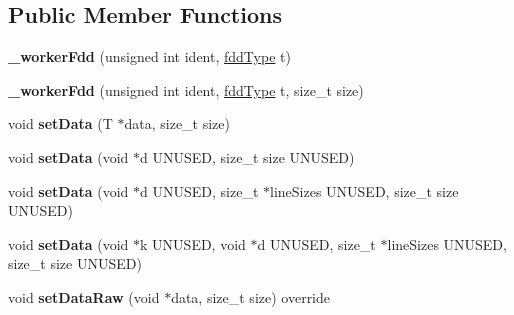 \subsection*{Public Member Functions}
\begin{DoxyCompactItemize}
\item 
\hypertarget{classfaster_1_1__workerFdd_a9f105bf8697f4f5332ccfb0fa7df8237}{}\label{classfaster_1_1__workerFdd_a9f105bf8697f4f5332ccfb0fa7df8237} 
{\bfseries \+\_\+worker\+Fdd} (unsigned int ident, \hyperlink{namespacefaster_aa8898687bc64536b60a3d5f365060cd6}{fdd\+Type} t)
\item 
\hypertarget{classfaster_1_1__workerFdd_ac8d6d1240857a56c57f5d85b6a4b67f5}{}\label{classfaster_1_1__workerFdd_ac8d6d1240857a56c57f5d85b6a4b67f5} 
{\bfseries \+\_\+worker\+Fdd} (unsigned int ident, \hyperlink{namespacefaster_aa8898687bc64536b60a3d5f365060cd6}{fdd\+Type} t, size\+\_\+t size)
\item 
\hypertarget{classfaster_1_1__workerFdd_a7031d0b585393f6e5a6ecc5e675a98ff}{}\label{classfaster_1_1__workerFdd_a7031d0b585393f6e5a6ecc5e675a98ff} 
void {\bfseries set\+Data} (T $\ast$data, size\+\_\+t size)
\item 
\hypertarget{classfaster_1_1__workerFdd_a18e7f4165cbd37d37f5759040b107cce}{}\label{classfaster_1_1__workerFdd_a18e7f4165cbd37d37f5759040b107cce} 
void {\bfseries set\+Data} (void $\ast$d U\+N\+U\+S\+ED, size\+\_\+t size U\+N\+U\+S\+ED)
\item 
\hypertarget{classfaster_1_1__workerFdd_ae2a8d9f60a3a0591f23dd5918451cecf}{}\label{classfaster_1_1__workerFdd_ae2a8d9f60a3a0591f23dd5918451cecf} 
void {\bfseries set\+Data} (void $\ast$d U\+N\+U\+S\+ED, size\+\_\+t $\ast$line\+Sizes U\+N\+U\+S\+ED, size\+\_\+t size U\+N\+U\+S\+ED)
\item 
\hypertarget{classfaster_1_1__workerFdd_a26f3dbf1187402ecd029a3ff1bf5f849}{}\label{classfaster_1_1__workerFdd_a26f3dbf1187402ecd029a3ff1bf5f849} 
void {\bfseries set\+Data} (void $\ast$k U\+N\+U\+S\+ED, void $\ast$d U\+N\+U\+S\+ED, size\+\_\+t $\ast$line\+Sizes U\+N\+U\+S\+ED, size\+\_\+t size U\+N\+U\+S\+ED)
\item 
\hypertarget{classfaster_1_1__workerFdd_a2439827c0e48411f92437a088f55b30f}{}\label{classfaster_1_1__workerFdd_a2439827c0e48411f92437a088f55b30f} 
void {\bfseries set\+Data\+Raw} (void $\ast$data, size\+\_\+t size) override
\item 
\hypertarget{classfaster_1_1__workerFdd_a236aaba89ce634bce445cfc8e00b0af1}{}\label{classfaster_1_1__workerFdd_a236aaba89ce634bce445cfc8e00b0af1} 

\end{DoxyCompactItemize}
